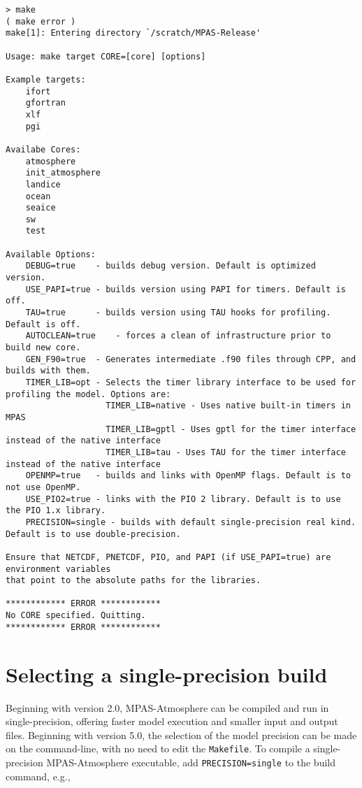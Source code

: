 {\small
\begin{verbatim}
> make
( make error )
make[1]: Entering directory `/scratch/MPAS-Release'

Usage: make target CORE=[core] [options]

Example targets:
    ifort
    gfortran
    xlf
    pgi

Availabe Cores:
    atmosphere
    init_atmosphere
    landice
    ocean
    seaice
    sw
    test

Available Options:
    DEBUG=true    - builds debug version. Default is optimized version.
    USE_PAPI=true - builds version using PAPI for timers. Default is off.
    TAU=true      - builds version using TAU hooks for profiling. Default is off.
    AUTOCLEAN=true    - forces a clean of infrastructure prior to build new core.
    GEN_F90=true  - Generates intermediate .f90 files through CPP, and builds with them.
    TIMER_LIB=opt - Selects the timer library interface to be used for profiling the model. Options are:
                    TIMER_LIB=native - Uses native built-in timers in MPAS
                    TIMER_LIB=gptl - Uses gptl for the timer interface instead of the native interface
                    TIMER_LIB=tau - Uses TAU for the timer interface instead of the native interface
    OPENMP=true   - builds and links with OpenMP flags. Default is to not use OpenMP.
    USE_PIO2=true - links with the PIO 2 library. Default is to use the PIO 1.x library.
    PRECISION=single - builds with default single-precision real kind. Default is to use double-precision.

Ensure that NETCDF, PNETCDF, PIO, and PAPI (if USE_PAPI=true) are environment variables
that point to the absolute paths for the libraries.

************ ERROR ************
No CORE specified. Quitting.
************ ERROR ************
\end{verbatim}

\section{Selecting a single-precision build}

Beginning with version 2.0, MPAS-Atmosphere can be compiled and run in single-precision, offering faster 
model execution and smaller input and output files. Beginning with version 5.0, the selection of the
model precision can be made on the command-line, with no need to edit the {\tt Makefile}.
To compile a single-precision MPAS-Atmosphere executable, add {\tt PRECISION=single} to the build command, e.g.,

}
